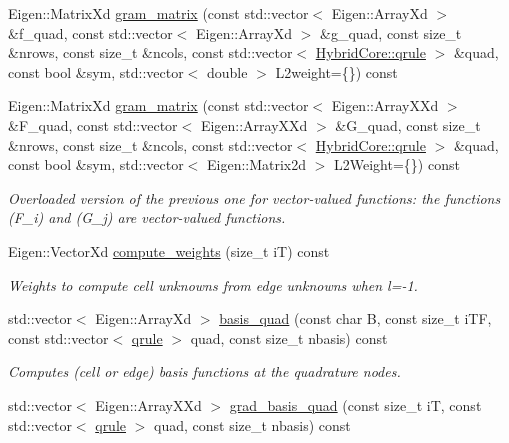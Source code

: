 \begin{DoxyCompactItemize}
Eigen\+::\+Matrix\+Xd \hyperlink{classHArDCore2D_1_1HybridCore_a1e9b987fd5c7a55f6243b99a8c19bbe4}{gram\+\_\+matrix} (const std\+::vector$<$ Eigen\+::\+Array\+Xd $>$ \&f\+\_\+quad, const std\+::vector$<$ Eigen\+::\+Array\+Xd $>$ \&g\+\_\+quad, const size\+\_\+t \&nrows, const size\+\_\+t \&ncols, const std\+::vector$<$ \hyperlink{structHArDCore2D_1_1HybridCore_1_1qrule}{Hybrid\+Core\+::qrule} $>$ \&quad, const bool \&sym, std\+::vector$<$ double $>$ L2weight=\{\}) const
\item 
Eigen\+::\+Matrix\+Xd \hyperlink{classHArDCore2D_1_1HybridCore_a9b09332324d2a9b70fa5e654fe843fb8}{gram\+\_\+matrix} (const std\+::vector$<$ Eigen\+::\+Array\+X\+Xd $>$ \&F\+\_\+quad, const std\+::vector$<$ Eigen\+::\+Array\+X\+Xd $>$ \&G\+\_\+quad, const size\+\_\+t \&nrows, const size\+\_\+t \&ncols, const std\+::vector$<$ \hyperlink{structHArDCore2D_1_1HybridCore_1_1qrule}{Hybrid\+Core\+::qrule} $>$ \&quad, const bool \&sym, std\+::vector$<$ Eigen\+::\+Matrix2d $>$ L2\+Weight=\{\}) const
\begin{DoxyCompactList}\small\item\em Overloaded version of the previous one for vector-\/valued functions\+: the functions (F\+\_\+i) and (G\+\_\+j) are vector-\/valued functions. \end{DoxyCompactList}\item 
\mbox{\label{classHArDCore2D_1_1HybridCore_a06825c5d156026d465a2798389aa952b}} 
Eigen\+::\+Vector\+Xd \hyperlink{classHArDCore2D_1_1HybridCore_a06825c5d156026d465a2798389aa952b}{compute\+\_\+weights} (size\+\_\+t iT) const
\begin{DoxyCompactList}\small\item\em Weights to compute cell unknowns from edge unknowns when l=-\/1. \end{DoxyCompactList}\item 
std\+::vector$<$ Eigen\+::\+Array\+Xd $>$ \hyperlink{classHArDCore2D_1_1HybridCore_abf958443b4a8f64bfd25d35572b0af01}{basis\+\_\+quad} (const char B, const size\+\_\+t i\+TF, const std\+::vector$<$ \hyperlink{structHArDCore2D_1_1HybridCore_1_1qrule}{qrule} $>$ quad, const size\+\_\+t nbasis) const
\begin{DoxyCompactList}\small\item\em Computes (cell or edge) basis functions at the quadrature nodes. \end{DoxyCompactList}\item 
std\+::vector$<$ Eigen\+::\+Array\+X\+Xd $>$ \hyperlink{classHArDCore2D_1_1HybridCore_a296b4872f6d440bd2940e0b8d9bdd522}{grad\+\_\+basis\+\_\+quad} (const size\+\_\+t iT, const std\+::vector$<$ \hyperlink{structHArDCore2D_1_1HybridCore_1_1qrule}{qrule} $>$ quad, const size\+\_\+t nbasis) const

\end{DoxyCompactItemize}
